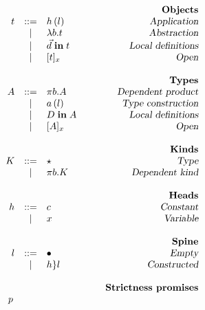\begin{figure}

\begin{center}
\begin{math}
\begin{array}{rclr}
&&&\qquad\textsl{\bf Objects}\\
t 

&::=& 
h\,(l) 
& \qquad\textsl{Application}
\\

&|&
\lambda b. t
& \qquad\textsl{Abstraction}
\\

&|&
\vec{d} \;\textbf{in}\; t
& \qquad\textsl{Local definitions}
\\

&|&
[ t ]_{x}
& \qquad\textsl{Open}
\\
\\
&&&\qquad\textsl{\bf Types}\\
A

&::=& 
\pi b. A
& \qquad\textsl{Dependent product}
\\

&|& 
a\,(l)
& \qquad\textsl{Type construction}
\\

&|& 
D \;\textbf{in}\; A
& \qquad\textsl{Local definitions}
\\


&|& 
[ A ]_{x}
& \qquad\textsl{Open}
\\
\\
&&&\qquad\textsl{\bf Kinds}\\
K

&::=&
\star
& \qquad\textsl{Type}
\\

&|&
\pi b. K
& \qquad\textsl{Dependent kind}
\\
\\

&&&\qquad\textsl{\bf Heads}\\
h

&::=& 
c
& \qquad\textsl{Constant}
\\
&|& 
x
& \qquad\textsl{Variable}
\\
\\
&&&\qquad\textsl{\bf Spine}\\
l

&::=& \bullet
& \qquad\textsl{Empty}
\\
&|& h\}{l}
& \qquad\textsl{Constructed}
\\
\\
&&&\qquad\textsl{\bf Strictness promises}\\
p 

\,\end{array}
\end{math}
\end{center}
\end{figure}
